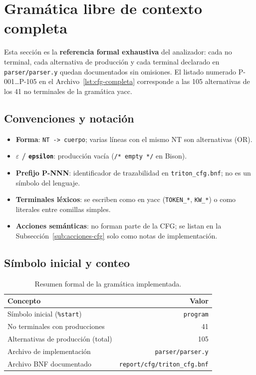 \appendix
\section{Gramática libre de contexto completa}
\label{ap:cfg-completa}

Esta sección es la \textbf{referencia formal exhaustiva} del analizador: cada no terminal, cada alternativa de producción y cada terminal declarado en \texttt{parser/parser.y} quedan documentados sin omisiones. El listado numerado P-001\ldots P-105 en el Archivo~\ref{lst:cfg-completa} corresponde a las 105 alternativas de los 41 no terminales de la gramática yacc.

\subsection{Convenciones y notación}
\begin{itemize}
  \item \textbf{Forma}: \texttt{NT -> cuerpo}; varias líneas con el mismo NT son alternativas (OR).
  \item \textbf{$\varepsilon$ / \texttt{epsilon}}: producción vacía (\texttt{/* empty */} en Bison).
  \item \textbf{Prefijo P-NNN}: identificador de trazabilidad en \texttt{triton\_cfg.bnf}; no es un símbolo del lenguaje.
  \item \textbf{Terminales léxicos}: se escriben como en yacc (\texttt{TOKEN\_*}, \texttt{KW\_*}) o como literales entre comillas simples.
  \item \textbf{Acciones semánticas}: no forman parte de la CFG; se listan en la Subsección~\ref{sub:acciones-cfg} solo como notas de implementación.
\end{itemize}

\subsection{Símbolo inicial y conteo}
\begin{table}[H]
\centering
\caption{Resumen formal de la gramática implementada.}
\label{tab:cfg-resumen}
\begin{tabular}{@{}lr@{}}
\toprule
\textbf{Concepto} & \textbf{Valor} \\
\midrule
Símbolo inicial (\texttt{\%start}) & \texttt{program} \\
No terminales con producciones & 41 \\
Alternativas de producción (total) & 105 \\
Archivo de implementación & \texttt{parser/parser.y} \\
Archivo BNF documentado & \texttt{report/cfg/triton\_cfg.bnf} \\
\bottomrule
\end{tabular}
\end{table}

